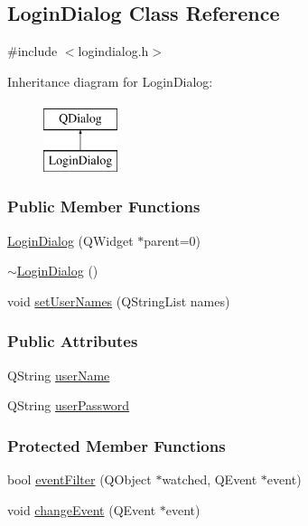 \hypertarget{classLoginDialog}{}\subsection{Login\+Dialog Class Reference}
\label{classLoginDialog}


{\ttfamily \#include $<$logindialog.\+h$>$}

Inheritance diagram for Login\+Dialog\+:\begin{figure}[H]
\begin{center}
\leavevmode
\includegraphics[height=2.000000cm]{classLoginDialog}
\end{center}
\end{figure}
\subsubsection*{Public Member Functions}
\begin{DoxyCompactItemize}
\item 
\mbox{\hyperlink{classLoginDialog_af231bf82d3c72985f62bb47067255f47}{Login\+Dialog}} (Q\+Widget $\ast$parent=0)
\item 
\mbox{\hyperlink{classLoginDialog_aa5d012ebc424713ca0cbd82be1f81133}{$\sim$\+Login\+Dialog}} ()
\item 
void \mbox{\hyperlink{classLoginDialog_a821b2e18f35f4e4d250213a04c4077de}{set\+User\+Names}} (Q\+String\+List names)
\end{DoxyCompactItemize}
\subsubsection*{Public Attributes}
\begin{DoxyCompactItemize}
\item 
Q\+String \mbox{\hyperlink{classLoginDialog_ac3aff74cd5cb23bb5e269775fd7b7672}{user\+Name}}
\item 
Q\+String \mbox{\hyperlink{classLoginDialog_aabe40abeacdb2903b5fa9a61a8562201}{user\+Password}}
\end{DoxyCompactItemize}
\subsubsection*{Protected Member Functions}
\begin{DoxyCompactItemize}
\item 
bool \mbox{\hyperlink{classLoginDialog_a3c1b6041fc659f3f409e129a5c4a7944}{event\+Filter}} (Q\+Object $\ast$watched, Q\+Event $\ast$event)
\item 
void \mbox{\hyperlink{classLoginDialog_a1256114f012018b32b37086f567ffc81}{change\+Event}} (Q\+Event $\ast$event)
\end{DoxyCompactItemize}
